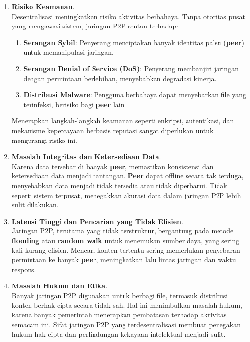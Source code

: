 \begin{enumerate}
	\item \textbf{Risiko Keamanan}. \\
	Desentralisasi meningkatkan risiko aktivitas berbahaya. Tanpa otoritas pusat yang mengawasi sistem, jaringan P2P rentan terhadap:
	\begin{enumerate}
		\item \textbf{Serangan Sybil}: Penyerang menciptakan banyak identitas palsu (\textbf{peer}) untuk memanipulasi jaringan.
		\item \textbf{Serangan Denial of Service (DoS)}: Penyerang membanjiri jaringan dengan permintaan berlebihan, menyebabkan degradasi kinerja.
		\item \textbf{Distribusi Malware}: Pengguna berbahaya dapat menyebarkan file yang terinfeksi, berisiko bagi \textbf{peer} lain.
	\end{enumerate}
	Menerapkan langkah-langkah keamanan seperti enkripsi, autentikasi, dan mekanisme kepercayaan berbasis reputasi sangat diperlukan untuk mengurangi risiko ini.
	
	\item \textbf{Masalah Integritas dan Ketersediaan Data}. \\
	Karena data tersebar di banyak \textbf{peer}, memastikan konsistensi dan ketersediaan data menjadi tantangan. \textbf{Peer} dapat offline secara tak terduga, menyebabkan data menjadi tidak tersedia atau tidak diperbarui. Tidak seperti sistem terpusat, menegakkan akurasi data dalam jaringan P2P lebih sulit dilakukan.
	
	\item \textbf{Latensi Tinggi dan Pencarian yang Tidak Efisien}. \\
	Jaringan P2P, terutama yang tidak terstruktur, bergantung pada metode \textbf{flooding} atau \textbf{random walk} untuk menemukan sumber daya, yang sering kali kurang efisien. Mencari konten tertentu sering memerlukan penyebaran permintaan ke banyak \textbf{peer}, meningkatkan lalu lintas jaringan dan waktu respons.
	
	\item \textbf{Masalah Hukum dan Etika}. \\
	Banyak jaringan P2P digunakan untuk berbagi file, termasuk distribusi konten berhak cipta secara tidak sah. Hal ini menimbulkan masalah hukum, karena banyak pemerintah menerapkan pembatasan terhadap aktivitas semacam ini. Sifat jaringan P2P yang terdesentralisasi membuat penegakan hukum hak cipta dan perlindungan kekayaan intelektual menjadi sulit.
	

\end{enumerate}
